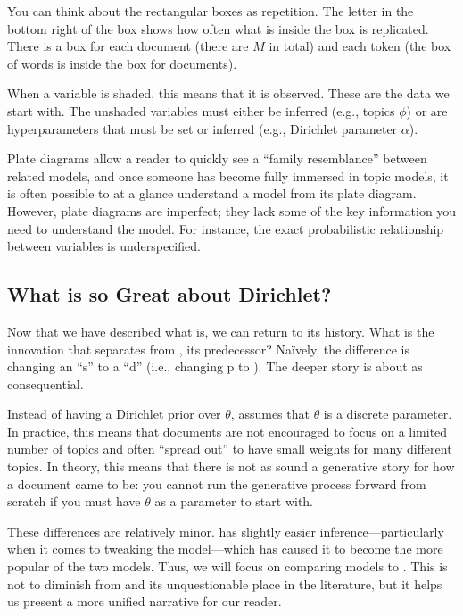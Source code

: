 You can think about the rectangular boxes as repetition.  The letter
in the bottom right of the box shows how often what is inside the box
is replicated.  There is a box for each document (there are $M$ in
total) and each token (the box of words is inside the box for
documents).

When a variable is shaded, this means that it is observed.  These are
the data we start with.  The unshaded variables must either be
inferred (e.g., topics $\phi$) or are hyperparameters that must be set
or inferred (e.g., Dirichlet parameter $\alpha$).

Plate diagrams allow a reader to quickly see a ``family resemblance''
between related models, and once someone has become fully immersed in
topic models, it is often possible to at a glance understand a model
from its plate diagram.  However, plate diagrams are imperfect; they
lack some of the key information you need to understand the model.
For instance, the exact probabilistic relationship between variables
is underspecified.

\subsection{What is so Great about Dirichlet?}
\label{sec:plsa-vs-lda}

Now that we have described what  is, we can return to its
history.  What is the innovation that separates  from
\plsa{}, its predecessor?  Na\"ively, the difference is changing an
``s'' to a ``d'' (i.e., changing p to ).  The deeper story is about as consequential.

Instead of having a Dirichlet prior over $\theta$, \plsa{} assumes
that $\theta$ is a discrete parameter.  In practice, this
means that documents are not encouraged to focus on a limited number of
topics and often ``spread out'' to have small weights for many
different topics.  In theory, this means that there is not as sound a
generative story for how a document came to be: you cannot run the
generative process forward from scratch if you must have $\theta$ as a
parameter to start with.

These differences are relatively minor.   has slightly easier
inference---particularly when it comes to tweaking the model---which
has caused it to become the more popular of the two models.  Thus, we
will focus on comparing models to .  This is
not to diminish from \plsa{} and its unquestionable place in the
literature, but it helps us present a more unified narrative for our reader.

